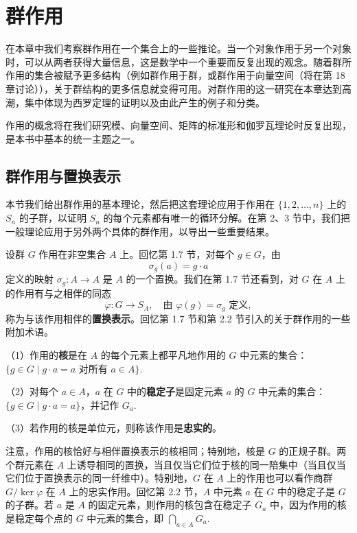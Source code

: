 

\setcounter{chapter}{3}

\chapter{群作用}

在本章中我们考察群作用在一个集合上的一些推论。当一个对象作用于另一个对象时，可以从两者获得大量信息，这是数学中一个重要而反复出现的观念。随着群所作用的集合被赋予更多结构（例如群作用于群，或群作用于向量空间（将在第 18 章讨论）），关于群结构的更多信息就变得可用。对群作用的这一研究在本章达到高潮，集中体现为西罗定理的证明以及由此产生的例子和分类。

作用的概念将在我们研究模、向量空间、矩阵的标准形和伽罗瓦理论时反复出现，是本书中基本的统一主题之一。

\section{群作用与置换表示}

本节我们给出群作用的基本理论，然后把这套理论应用于作用在 \(\{1, 2, \ldots, n\}\) 上的 \(S_n\) 的子群，以证明 \(S_n\) 的每个元素都有唯一的循环分解。在第 2、3 节中，我们把一般理论应用于另外两个具体的群作用，以导出一些重要结果。

设群 \(G\) 作用在非空集合 \(A\) 上。回忆第 1.7 节，对每个 \(g \in G\)，由
\[
\sigma_g(a) = g \cdot a
\]
定义的映射 \(\sigma_g : A \to A\) 是 \(A\) 的一个置换。我们在第 1.7 节还看到，对 \(G\) 在 \(A\) 上的作用有与之相伴的同态
\[
\varphi : G \to S_A, \quad \text{由 } \varphi(g) = \sigma_g \text{ 定义},
\]
称为与该作用相伴的\textbf{置换表示}。回忆第 1.7 节和第 2.2 节引入的关于群作用的一些附加术语。

\begin{definition}
（1）作用的\textbf{核}是在 \(A\) 的每个元素上都平凡地作用的 \(G\) 中元素的集合：\(\{g \in G \mid g \cdot a = a \text{ 对所有 } a \in A\}\).

（2）对每个 \(a \in A\)，\(a\) 在 \(G\) 中的\textbf{稳定子}是固定元素 \(a\) 的 \(G\) 中元素的集合：\(\{g \in G \mid g \cdot a = a\}\)，并记作 \(G_a\).

（3）若作用的核是单位元，则称该作用是\textbf{忠实的}。
\end{definition}

注意，作用的核恰好与相伴置换表示的核相同；特别地，核是 \(G\) 的正规子群。两个群元素在 \(A\) 上诱导相同的置换，当且仅当它们位于核的同一陪集中（当且仅当它们位于置换表示的同一纤维中）。特别地，\(G\) 在 \(A\) 上的作用也可以看作商群 \(G/\ker \varphi\) 在 \(A\) 上的忠实作用。回忆第 2.2 节，\(A\) 中元素 \(a\) 在 \(G\) 中的稳定子是 \(G\) 的子群。若 \(a\) 是 \(A\) 的固定元素，则作用的核包含在稳定子 \(G_a\) 中，因为作用的核是稳定每个点的 \(G\) 中元素的集合，即 \(\bigcap_{a \in A} G_a\).

